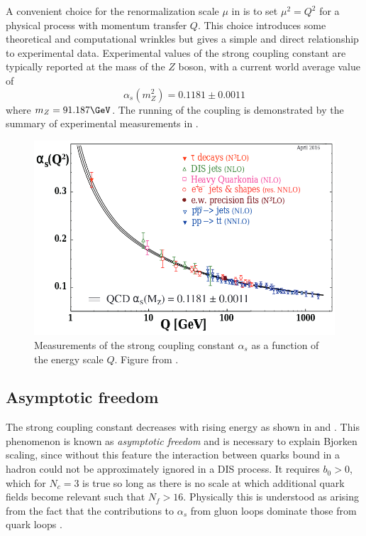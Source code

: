 A convenient choice for the renormalization scale $\mu$ in  is to set $\mu^2 = Q^2$ for a physical process with momentum transfer $Q$.
This choice introduces some theoretical and computational wrinkles but gives a simple and direct relationship to experimental data.
Experimental values of the strong coupling constant are typically reported at the mass of the $Z$ boson, with a current world average value of
\[
\alpha_s(m_Z^2) = 0.1181 \pm 0.0011
\]
where $m_Z = 91.187 \GeV$.
The running of the coupling is demonstrated by the summary of experimental measurements in .

\begin{figure}[t]
  \includegraphics{running_as.png}
  \caption{Measurements of the strong coupling constant $\alpha_s$ as a function of the energy scale $Q$. Figure from .}
  \label{fig:running_coupling}
\end{figure}

\subsection{Asymptotic freedom}

The strong coupling constant decreases with rising energy as shown in  and .
This phenomenon is known as \emph{asymptotic freedom} and is necessary to explain Bjorken scaling, since without this feature the interaction between quarks bound in a hadron could not be approximately ignored in a \ac{DIS} process.
It requires $b_0 > 0$, which for $N_c = 3$ \qcd is true so long as there is no scale at which additional quark fields become relevant such that $N_f > 16$.
Physically this is understood as arising from the fact that the contributions to $\alpha_s$ from gluon loops dominate those from quark loops \cite{Wilczek:2005az}.

